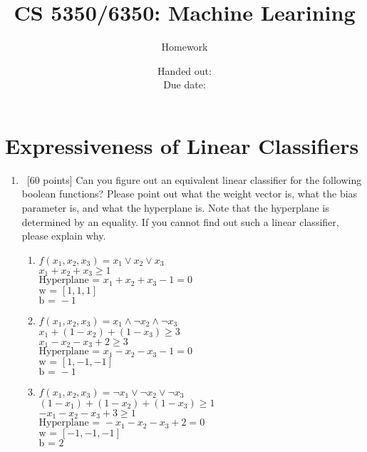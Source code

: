 \documentclass[12pt, fullpage,letterpaper]{article}
\title{CS 5350/6350: Machine Learining \semester}
\author{Homework \assignmentId}
\date{Handed out: \releaseDate\\
  Due date: \dueDate}
\begin{document}
\maketitle





\section{Expressiveness of Linear Classifiers}
\begin{enumerate}
\item~[60 points] Can you figure out an equivalent linear classifier for the following boolean functions? Please point out what the weight vector is, what the bias parameter is, and what the hyperplane is. Note that the hyperplane is determined by an equality. If you cannot find out such a  linear classifier, please explain why. 
\begin{enumerate}
\item $f(x_1, x_2, x_3) = x_1 \lor x_2 \lor x_3$\\
    $x_1 + x_2 + x_3 \geq 1$\\

    $\text{Hyperplane = } x_1 + x_2 + x_3 - 1 = 0$\\
    $\text{w = } [1, 1, 1]$\\
    $\text{b = } -1$

\item $f(x_1, x_2, x_3) = x_1 \land \neg x_2 \land \neg x_3$\\
    $x_1 + (1 - x_{2}) + (1 - x_{3}) \geq 3$\\
    $x_1  - x_{2} - x_{3} + 2 \geq 3$\\

    $\text{Hyperplane = } x_1 - x_{2} - x_{3} - 1 = 0$\\
    $\text{w = } [1, -1, -1]$\\
    $\text{b = } -1$
\item $f(x_1, x_2, x_3) = \neg x_1 \lor \neg x_2 \lor \neg x_3$\\
    $ (1 - x_{1}) + (1 - x_2) + (1 - x_3) \geq 1$\\
    $ -x_{1} - x_2 - x_3 + 3 \geq 1$\\

    $\text{Hyperplane = } -x_{1} - x_2 - x_3 + 2 = 0$\\
    $\text{w = } [-1, -1, -1]$\\
    $\text{b = } 2$


\end{enumerate}
\end{enumerate}
\end{document}
